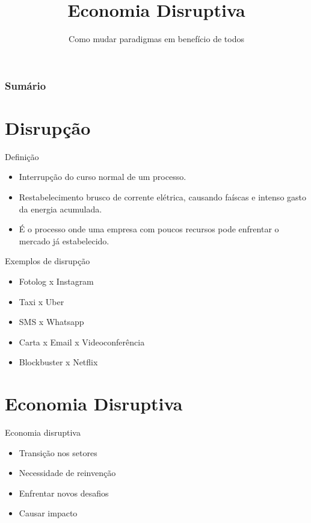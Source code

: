 \documentclass[t]{beamer}
\title{Economia Disruptiva}
\subtitle{Como mudar paradigmas em benefício de todos}
\begin{document}
\frame{\titlepage}

\begin{frame}
\frametitle{Sumário}
\tableofcontents
\end{frame}

\section{Disrupção}

\begin{frame}{Definição}
	\begin{itemize}	
		\item Interrupção do curso normal de um processo.
		\item Restabelecimento brusco de corrente elétrica, causando faíscas e intenso gasto da energia acumulada.
		\item É o processo onde uma empresa com poucos recursos pode enfrentar o mercado já estabelecido.  
	\end{itemize}
\end{frame}

\begin{frame}{Exemplos de disrupção}
	\begin{itemize}
		\item Fotolog x Instagram
		\item Taxi x Uber
		\item SMS x Whatsapp
		\item Carta x Email x Videoconferência
		\item Blockbuster x Netflix
	\end{itemize}
\end{frame}

\section{Economia Disruptiva}

\begin{frame}{Economia disruptiva}
	\begin{itemize}
		\item Transição nos setores
		\item Necessidade de reinvenção
		\item Enfrentar novos desafios
		\item Causar impacto
	\end{itemize}
\end{frame}
\end{document}
